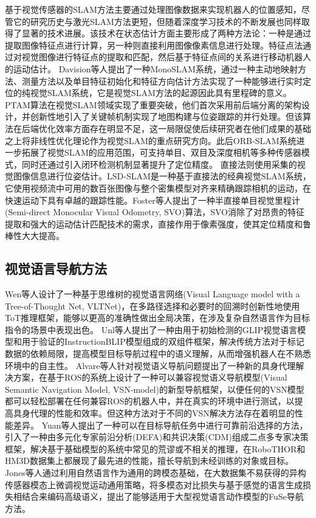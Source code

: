 	基于视觉传感器的SLAM方法主要通过处理图像数据来实现机器人的位置感知，尽管它的研究历史与激光SLAM方法更短，但随着深度学习技术的不断发展也同样取得了显著的技术进展。该技术在状态估计方面主要形成了两种方法论：一种是通过提取图像特征点进行计算，另一种则直接利用图像像素信息进行处理。特征点法通过对视觉图像进行特征点的提取和匹配，然后基于特征点间的关系进行移动机器人的运动估计。
	Davision\cite{davison2007monoslam, davison2003real}等人提出了一种MonoSLAM系统，通过一种主动地映射方法、测量方法以及单目特征初始化和特征方向估计方法实现了一种能够进行实时定位的纯视觉SLAM系统，它是视觉SLAM方法的起源因此具有里程碑的意义。
	PTAM\cite{klein2007parallel}算法在视觉SLAM领域实现了重要突破，他们首次采用前后端分离的架构设计，并创新性地引入了关键帧机制实现了地图构建与位姿跟踪的并行处理。但该算法在后端优化效率方面存在明显不足，这一局限促使后续研究者在他们成果的基础之上将非线性优化理论作为视觉SLAM的重点研究方向。此后ORB-SLAM\cite{mur2015orb}系统进一步拓展了视觉SLAM的应用范围，可支持单目、双目及深度相机等多种传感器模式，同时还通过引入闭环检测机制显著提升了定位精度。
	直接法则使用采集的视觉图像信息进行位姿估计。LSD-SLAM\cite{newcombe2011dtam}是一种基于直接法的经典视觉SLAM系统，它使用视频流中可用的数百张图像与整个密集模型对齐来精确跟踪相机的运动，在快速运动下具有卓越的跟踪性能。Foster\cite{forster2014svo}等人提出了一种半直接单目视觉里程计(Semi-direct Monocular Visual Odometry, SVO)算法，SVO消除了对昂贵的特征提取和强大的运动估计匹配技术的需求，直接作用于像素强度，使其定位精度和鲁棒性大大提高。


	



\subsection{视觉语言导航方法}
	Wen\cite{wen2025zero}等人设计了一种基于思维树的视觉语言网络(Visual Language model with a Tree-of-Thought Net, VLTNet)，在多路径选择和必要时的回溯时创新性地使用ToT推理框架，能够以更高的准确性做出全局决策，在涉及复杂自然语言作为目标指令的场景中表现出色。
	Unl\cite{unlu2025reliable}等人提出了一种由用于初始检测的GLIP视觉语言模型和用于验证的InstructionBLIP模型组成的双组件框架，解决传统方法对于标记数据的依赖局限，提高模型目标导航过程中的语义理解，从而增强机器人在不熟悉环境中的自主性。
	Alvare\cite{gutierrez2025visual}等人针对视觉语义导航问题提出了一种新的具身代理解决方案，在基于ROS的系统上设计了一种可以兼容视觉语义导航模型(Visual Semantic Navigation Model, VSN-model)的新型导航框架，以便任何的VSN模型都可以轻松部署在任何兼容ROS的机器人中，并在真实的环境中进行测试，以提高具身代理的性能和效率。但这种方法对于不同的VSN解决方法存在着明显的性能差异。
	Yuan\cite{yuan2025exploring}等人提出了一种可以在目标导航任务中进行可靠前沿选择的方法，引入了一种由多元化专家前沿分析(DEFA)和共识决策(CDM)组成二点多专家决策框架，解决基于基础模型的系统中常见的荒谬或不相关的推理，在RoboTHOR和HM3D数据集上都展现了最先进的性能，擅长导航到未经训练的对象或目标。
	Jones\cite{jones2025beyond}等人通过利用自然语言作为通用的跨模态基础，在大数据集不易获得的异构传感器模态上微调视觉运动通用策略，将多模态对比损失与基于感觉的语言生成损失相结合来编码高级语义，提出了能够适用于大型视觉语言动作模型的FuSe导航方法。

